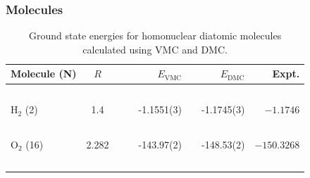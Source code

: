 \begin{frame}
\frametitle{Molecules}
 \begin{table}
\begin{center}
\begin{tabular}{lcccrlrr}
Molecule (N) & $R$ & & \qquad & $E_\mathrm{VMC}$ & & \qquad $E_\mathrm{DMC}$ & \qquad\,\, Expt.\\
\hline\hline
\ \\
$\mathrm{H_2}$ (2) & 1.4   & &\qquad & -1.1551(3)    & \qquad   & -1.1745(3)   & \qquad $-1.1746$     \\
\ \\
$\mathrm{O_2}$ (16) & 2.282 & &\qquad & -143.97(2)    & \qquad   & -148.53(2)   & \qquad $-150.3268$    \\
\ \\
\end{tabular}
\caption{Ground state energies for homonuclear diatomic molecules calculated using VMC and DMC. }
\label{tab:MoleculesRes}
\end{center}
\end{table}
\end{frame}


